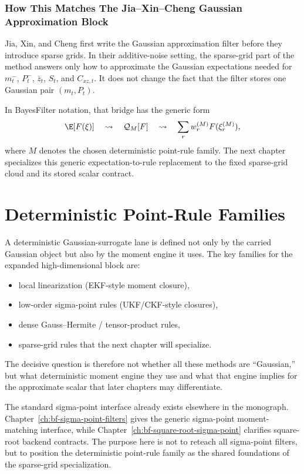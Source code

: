 \subsubsection{How This Matches The Jia--Xin--Cheng Gaussian Approximation Block}
\label{subsec:bf-hd-gq-jia-block}

Jia, Xin, and Cheng first write the Gaussian approximation filter before they
introduce sparse grids.  In their additive-noise setting, the sparse-grid part of
the method answers only how to approximate the Gaussian expectations needed for
\(m_t^-\), \(P_t^-\), \(\bar z_t\), \(S_t\), and \(C_{xz,t}\).  It does not
change the fact that the filter stores one Gaussian pair \((m_t,P_t)\).

In BayesFilter notation, that bridge has the generic form
\begin{equation}
  \E[F(\xi)]
  \quad\leadsto\quad
  \mathcal Q_M[F]
  \quad\leadsto\quad
  \sum_{r} w_r^{(M)} F(\xi_r^{(M)}),
  \label{eq:bf-hd-gq-expectation-to-rule}
\end{equation}
where \(M\) denotes the chosen deterministic point-rule family.  The next
chapter specializes this generic expectation-to-rule replacement to the fixed
sparse-grid cloud and its stored scalar contract.

\section{Deterministic Point-Rule Families}
\label{sec:bf-hd-gq-rule-families}

A deterministic Gaussian-surrogate lane is defined not only by the carried
Gaussian object but also by the moment engine it uses.  The key families for the
expanded high-dimensional block are:
\begin{itemize}[leftmargin=0.28in]
  \item local linearization (EKF-style moment closure),
  \item low-order sigma-point rules (UKF/CKF-style closures),
  \item dense Gauss--Hermite / tensor-product rules,
  \item sparse-grid rules that the next chapter will specialize.
\end{itemize}
The decisive question is therefore not whether all these methods are “Gaussian,”
but what deterministic moment engine they use and what that engine implies for
the approximate scalar that later chapters may differentiate.

The standard sigma-point interface already exists elsewhere in the monograph.
Chapter~\ref{ch:bf-sigma-point-filters} gives the generic sigma-point
moment-matching interface, while Chapter~\ref{ch:bf-square-root-sigma-point}
clarifies square-root backend contracts.  The purpose here is not to reteach all
sigma-point filters, but to position the deterministic point-rule family as the
shared foundations of the sparse-grid specialization.

